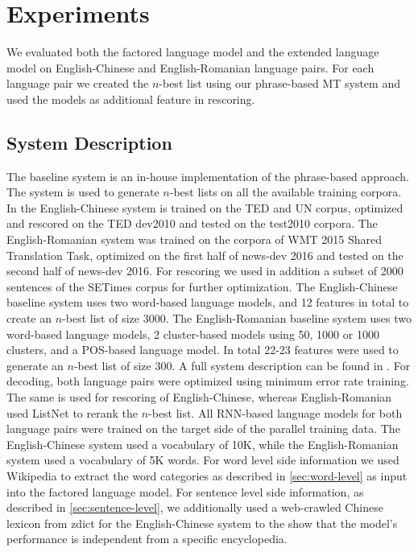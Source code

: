 \documentclass[a4paper]{article}
\begin{document}
\section{Experiments}
We evaluated both the factored language model and the extended language model on English-Chinese and English-Romanian language pairs. For each language pair we created the $n$-best list using our phrase-based MT system and used the models as additional feature in rescoring.

\subsection{System Description}
The baseline system is an in-house implementation of the phrase-based approach. The system is used to generate $n$-best lists on all the available training corpora. In the English-Chinese system is trained on the TED and UN corpus, optimized and rescored on the TED dev2010 and tested on the test2010 corpora.
The English-Romanian system was trained on the corpora of WMT 2015 Shared Translation Task, optimized on the first half of news-dev 2016 and tested on the second half of news-dev 2016. For rescoring we used in addition a subset of 2000 sentences of the SETimes corpus for further optimization.
The English-Chinese baseline system uses two word-based language models, and 12 features in total to create an $n$-best list of size 3000.
The English-Romanian baseline system uses two word-based language models, 2 cluster-based models using 50, 1000 or 1000 clusters, and a POS-based language model. In total 22-23 features were used to generate an $n$-best list of size 300. A full system description can be found in \cite{niehuesusing}.
For decoding, both language pairs were optimized using minimum error rate training. The same is used for rescoring of English-Chinese, whereas English-Romanian used ListNet to rerank the $n$-best list.
All RNN-based language models for both language pairs were trained on the target side of the parallel training data. The English-Chinese system used a vocabulary of 10K, while the English-Romanian system used a vocabulary of 5K words. For word level side information we used Wikipedia to extract the word categories as described in \ref{sec:word-level} as input into the factored language model.
For sentence level side information, as described in \ref{sec:sentence-level}, we additionally used a web-crawled Chinese lexicon from zdict for the English-Chinese system to the show that the model's performance is independent from a specific encyclopedia.
\end{document}
